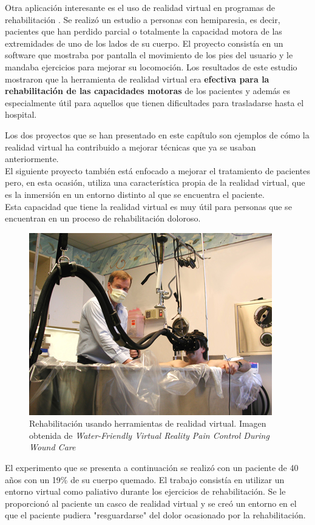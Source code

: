 \documentclass[twoside, 11pt]{epstfg}
\begin{document}
Otra aplicación interesante es el uso de realidad virtual en programas de rehabilitación \cite{hu2016virtual} \cite{kaliki2013evaluation}.
Se realizó un estudio a personas con hemiparesia, es decir, pacientes que han perdido parcial o totalmente la capacidad motora de las extremidades de uno de los lados de su cuerpo. El proyecto consistía en un software que mostraba por pantalla el movimiento de los pies  del usuario y le mandaba ejercicios para mejorar su locomoción. 
Los resultados de este estudio mostraron que la herramienta de realidad virtual era \textbf{efectiva para la rehabilitación de las capacidades motoras} de los pacientes y además es especialmente útil para aquellos que tienen dificultades para trasladarse hasta el hospital.\cite{Llorens2015418}

Los dos proyectos que se han presentado en este capítulo son ejemplos de cómo la realidad virtual ha contribuido a mejorar técnicas que ya se usaban anteriormente.\\
El siguiente proyecto también está enfocado a mejorar el tratamiento de pacientes pero, en esta ocasión, utiliza una característica propia de la realidad virtual, que es la inmersión en un entorno distinto al que se encuentra el paciente.\\
Esta capacidad que tiene la realidad virtual es muy útil para personas que se encuentran en un proceso de rehabilitación doloroso.



\begin{figure}[H]
	\centerline{
		\mbox{\includegraphics[width=.50\textwidth]{images/waterfriendly.png}}
	}
	\caption{Rehabilitación usando herramientas de realidad virtual. Imagen obtenida de \textit{Water-Friendly Virtual Reality Pain Control During Wound Care} \cite{JCLP:JCLP10244}}
	\label{water}
	
\end{figure}

El experimento que se presenta a continuación se realizó con un paciente de 40 años con un 19\% de su cuerpo quemado. El trabajo consistía en utilizar un entorno virtual como paliativo durante los ejercicios de rehabilitación.
Se le proporcionó al paciente un casco de realidad virtual y se creó un entorno en el que el paciente pudiera "resguardarse" del dolor ocasionado por la rehabilitación.
\end{document}
